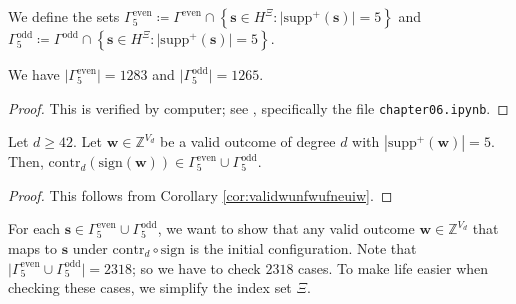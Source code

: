 \begin{definition}
    We define the sets \( \Gamma^{\mathrm{even}}_5 \coloneqq \Gamma^{\mathrm{even}} \cap \left\{ \mathbf{s} \in H^{\Xi} : \lvert \mathrm{supp}^+(\mathbf{s}) \rvert = 5 \right\} \) and \( \Gamma^{\mathrm{odd}}_5 \coloneqq \Gamma^{\mathrm{odd}} \cap \left\{ \mathbf{s} \in H^{\Xi} : \lvert \mathrm{supp}^+(\mathbf{s}) \rvert = 5 \right\} \).
\end{definition}

\begin{proposition}
    We have \( \lvert \Gamma^{\mathrm{even}}_5 \rvert  = 1283\) and \( \lvert \Gamma^{\mathrm{odd}}_5 \rvert  = 1265\).
\end{proposition}

\begin{proof}
    This is verified by computer; see \cite{ducrepo}, specifically the file \texttt{chapter06.ipynb}.
\end{proof}

\begin{corollary}
    Let \( d\geq 42 \). Let \( \mathbf{w} \in \mathbb{Z}^{V_d} \) be a valid outcome of degree \( d \) with \( |\mathrm{supp}^+(\mathbf w)| = 5 \). Then, \( \mathrm{contr}_d(\mathrm{sign}(\mathbf{w})) \in \Gamma^{\mathrm{even}}_5 \cup \Gamma^{\mathrm{odd}}_5 \).
\end{corollary}

\begin{proof}
    This follows from Corollary \ref{cor:validwunfwufneuiw}.
\end{proof}

For each \( \mathbf{s} \in \Gamma^{\mathrm{even}}_5 \cup \Gamma^{\mathrm{odd}}_5 \), we want to show that any valid outcome \( \mathbf{w} \in \mathbb{Z}^{V_d} \) that maps to \( \mathbf{s} \) under \( \mathrm{contr}_d \circ \mathrm{sign} \) is the initial configuration. Note that \( \lvert \Gamma^{\mathrm{even}}_5 \cup \Gamma^{\mathrm{odd}}_5 \rvert = 2318 \); so we have to check \( 2318 \) cases. To make life easier when checking these cases, we simplify the index set \( \Xi \).

